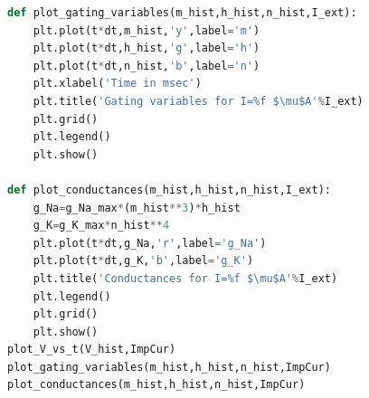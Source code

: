 \documentclass[12pt,a4paper]{report}
\begin{document}
\begin{lstlisting}[language=Python, caption={Python code for Hodgkin-Huxley simulation}, label={lst:python_code}]
def plot_gating_variables(m_hist,h_hist,n_hist,I_ext):
    plt.plot(t*dt,m_hist,'y',label='m')
    plt.plot(t*dt,h_hist,'g',label='h')
    plt.plot(t*dt,n_hist,'b',label='n')
    plt.xlabel('Time in msec')
    plt.title('Gating variables for I=%f $\mu$A'%I_ext)
    plt.grid()
    plt.legend()
    plt.show()

def plot_conductances(m_hist,h_hist,n_hist,I_ext):
    g_Na=g_Na_max*(m_hist**3)*h_hist
    g_K=g_K_max*n_hist**4
    plt.plot(t*dt,g_Na,'r',label='g_Na')
    plt.plot(t*dt,g_K,'b',label='g_K')
    plt.title('Conductances for I=%f $\mu$A'%I_ext)
    plt.legend()
    plt.grid()
    plt.show()
plot_V_vs_t(V_hist,ImpCur)
plot_gating_variables(m_hist,h_hist,n_hist,ImpCur)
plot_conductances(m_hist,h_hist,n_hist,ImpCur)

\end{lstlisting}
\end{document}
